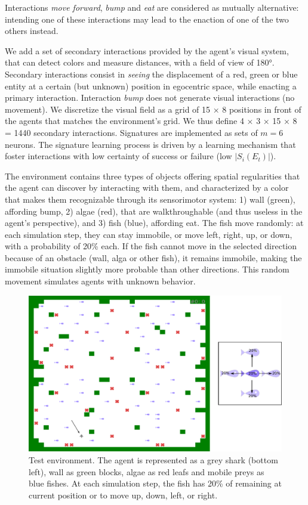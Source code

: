 \documentclass[conference]{IEEEtran}
\begin{document}
Interactions \textit{move forward}, \textit{bump} and \textit{eat} are considered as mutually alternative: intending one of these interactions may lead to the enaction of one of the two others instead.

We add a set of secondary interactions provided by the agent’s visual system, that can detect colors and measure distances, with a field of view of 180°.
Secondary interactions consist in \textit{seeing} the displacement of a red, green or blue entity at a certain (but unknown) position in egocentric space, while enacting a primary interaction.
Interaction \textit{bump} does not generate visual interactions (no movement).
We discretize the visual field as a grid of 15 × 8 positions in front of the agents that matches the environment's grid.
We thus define 4 × 3 × 15 × 8 = 1440 secondary interactions.
Signatures are implemented as sets of $m=6$ neurons.
The signature learning process is driven by a learning mechanism that foster interactions with low certainty of success or failure (low $|S_i(E_t)|$).

The environment contains three types of objects offering spatial regularities that the agent can discover by interacting with them, and characterized by a color that makes them recognizable through its sensorimotor system: 1) wall (green), affording bump, 2) algae (red), that are walkthroughable (and thus useless in the agent's perspective), and 3) fish (blue), affording eat.
The fish move randomly: at each simulation step, they can stay immobile, or move left, right, up, or down, with a probability of 20\% each.
If the fish cannot move in the selected direction because of an obstacle (wall, alga or other fish), it remains immobile, making the immobile situation slightly more probable than other directions. This random movement simulates agents with unknown behavior.

\begin{figure}[htbp]
\centerline{\includegraphics[scale=0.28]{img/environment.pdf}}
\caption{Test environment. The agent is represented as a grey shark (bottom left), wall as green blocks, algae as red leafs and mobile preys as blue fishes. At each simulation step, the fish has 20\% of remaining at current position or to move up, down, left, or right.
}
\label{fig:environment}
\end{figure}
\end{document}
